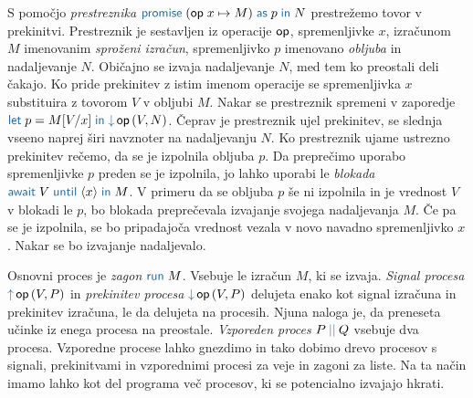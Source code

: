 S pomočjo \emph{prestreznika} $\tmwith{op}{x}{M}{p}{N}$ prestrežemo tovor v prekinitvi. Prestreznik je sestavljen iz operacije $\mathsf{op}$, spremenljivke $x$, izračunom $M$ imenovanim \emph{sproženi izračun}, spremenljivko $p$ imenovano \emph{obljuba} in nadaljevanje $N$.
Običajno se izvaja nadaljevanje $N$, med tem ko preostali deli čakajo. Ko pride prekinitev z istim imenom operacije se spremenljivka $x$ substituira z tovorom $V$ v obljubi $M$. Nakar se prestreznik spremeni v zaporedje $\tmlet{p}{M[V/x]}{\tmopin{op}{V}{N}}$. Čeprav je prestreznik ujel prekinitev, se slednja vseeno naprej širi navznoter na nadaljevanju $N$. Ko prestreznik ujame ustrezno prekinitev rečemo, da se je izpolnila obljuba $p$.
Da preprečimo uporabo spremenljivke $p$ preden se je izpolnila, jo lahko uporabi le \emph{blokada} $\tmawait{V}{x}{M}$. V primeru da se obljuba $p$ še ni izpolnila in je vrednost $V$ v blokadi le $p$, bo blokada preprečevala izvajanje svojega nadaljevanja $M$. Če pa se je izpolnila, se bo pripadajoča vrednost vezala v novo navadno spremenljivko $x$. Nakar se bo izvajanje nadaljevalo.

Osnovni proces je \emph{zagon} $\tmrun{M}$. Vsebuje le izračun $M$, ki se izvaja.
\emph{Signal procesa} $\tmopout{op}{V}{P}$ in \emph{prekinitev procesa} $\tmopin{op}{V}{P}$ delujeta enako kot signal izračuna in prekinitev izračuna, le da delujeta na procesih. Njuna naloga je, da preneseta učinke iz enega procesa na preostale.
\emph{Vzporeden proces} $\tmpar{P}{Q}$ vsebuje dva procesa. Vzporedne procese lahko gnezdimo in tako dobimo drevo procesov s signali, prekinitvami in vzporednimi procesi za veje in zagoni za liste. Na ta način imamo lahko kot del programa več procesov, ki se potencialno izvajajo hkrati.



